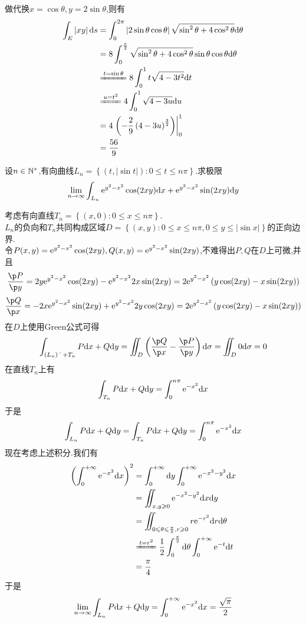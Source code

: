 \documentclass{ctexart}
\begin{document}
\begin{solution}
    做代换$x=\cos\theta,y=2\sin\theta$,则有
    \[\begin{aligned}
        \int_E\left|xy\right|\di s
        &= \int_0^{2\pi}\left|2\sin\theta\cos\theta\right|\sqrt{\sin^2\theta+4\cos^2\theta}\di\theta \\
        &= 8\int_0^{\frac\pi2}\sqrt{\sin^2\theta+4\cos^2\theta}\sin\theta\cos\theta\di\theta \\
        &\xlongequal{t=\sin\theta} 8\int_0^1t\sqrt{4-3t^2}\di t \\
        &\xlongequal{u=t^2} 4\int_0^1\sqrt{4-3u}\di u \\
        &= 4\left.\left(-\dfrac29\left(4-3u\right)^{\frac32}\right)\right|_0^1 \\
        &= \dfrac{56}{9}
    \end{aligned}\]
\end{solution}
\begin{problem}[4.(15\songti{分})]
    设$n\in\mathbb{N}^*$,有向曲线$L_n=\left\{\left(t,\left|\sin t\right|\right):0\leqslant t\leqslant n\pi\right\}$.求极限
    \[\lim_{n\to\infty}\int_{L_n}\mathrm{e}^{y^2-x^2}\cos(2xy)\mathrm{d} x+\mathrm{e}^{y^2-x^2}\sin(2xy)\mathrm{d} y\]

\end{problem}
\begin{solution}
    考虑有向直线$T_n=\left\{(x,0):0\leqslant x\leqslant n\pi\right\}$.\\
    $L_n$的负向和$T_n$共同构成区域$D=\left\{(x,y):0\leqslant x\leqslant n\pi,0\leqslant y\leqslant \left|\sin x\right|\right\}$的正向边界.\\
    令$P(x,y)=\mathrm{e}^{y^2-x^2}\cos(2xy),Q(x,y)=\mathrm{e}^{y^2-x^2}\sin(2xy)$,不难得出$P,Q$在$D$上可微,并且
    \[\dfrac{\p P}{\p y}=2y\e^{y^2-x^2}\cos(2xy)-\e^{y^2-x^2}2x\sin(2xy)=2\e^{y^2-x^2}\left(y\cos(2xy)-x\sin(2xy)\right)\]
    \[\dfrac{\p Q}{\p x}=-2x\e^{y^2-x^2}\sin(2xy)+\e^{y^2-x^2}2y\cos(2xy)=2\e^{y^2-x^2}\left(y\cos(2xy)-x\sin(2xy)\right)\]
    在$D$上使用Green公式可得
    \[\int_{\left(L_n\right)^-+T_n}P\di x+Q\di y
    =\iint_{D}\left(\dfrac{\p Q}{\p x}-\dfrac{\p P}{\p y}\right)\di\sigma
    =\iint_D0\di\sigma=0
    \]
    在直线$T_n$上有
    \[\int_{T_n}P\mathrm{d} x+Q\mathrm{d} y=\int_0^{n\pi}\mathrm{e}^{-x^2}\mathrm{d} x\]
    于是
    \[\int_{L_n}P\mathrm{d} x+Q\mathrm{d} y=\int_{T_n}P\mathrm{d} x+Q\mathrm{d} y=\int_0^{n\pi}\mathrm{e}^{-x^2}\mathrm{d} x\]
    现在考虑上述积分.我们有
    \[\begin{aligned}
        \left(\int_{0}^{+\infty}\e^{-x^2}\di x\right)^2
        &= \int_0^{+\infty}\di y\int_0^{+\infty}\e^{-x^2-y^2}\di x \\
        &= \iint_{x,y\geqslant 0}\e^{-x^2-y^2}\di x\di y \\
        &= \iint_{0\leqslant\theta\leqslant\frac\pi2,r\geqslant 0}r\e^{-r^2}\di r\di \theta\\
        &\xlongequal{t=r^2} \dfrac12\int_0^{\frac\pi2}\di\theta\int_0^{+\infty}\e^{-t}\di t \\
        &= \dfrac{\pi}{4}
    \end{aligned}\]
    于是
    \[\lim_{n\to\infty}\int_{L_n}P\mathrm{d} x+Q\mathrm{d} y=\int_0^{+\infty}\mathrm{e}^{-x^2}\mathrm{d} x=\dfrac{\sqrt\pi}{2}\]

\end{solution}
\end{document}
